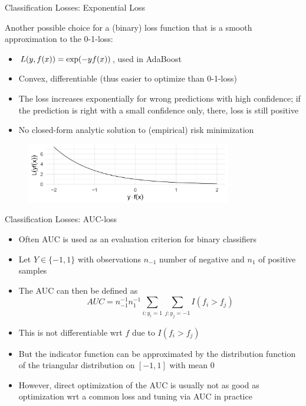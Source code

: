 \begin{vbframe}{Classification Losses: Exponential Loss}

Another possible choice for a (binary) loss function that is a smooth approximation to the 0-1-loss:
\begin{itemize}
\item $L(y, f(x)) = \exp(-yf(x))$, used in AdaBoost
\item Convex, differentiable (thus easier to optimize than 0-1-loss)
\item The loss increases exponentially for wrong predictions with high confidence; if the prediction is right with a small confidence only, there, loss is still positive
\item No closed-form analytic solution to (empirical) risk minimization
\end{itemize}


\begin{figure}
\includegraphics[width = 0.8\textwidth]{figure_man/exponential-loss.png}
\end{figure}

\end{vbframe}

\begin{vbframe}{Classification Losses: AUC-loss}

\begin{itemize}
\item Often AUC is used as an evaluation criterion for binary classifiers
\item Let $Y \in \{-1, 1\}$ with observations $n_{-1}$ number of negative and $n_{1}$ of positive samples %
\item The AUC can then be defined as
$$AUC = n_{-1}^{-1} n_1^{-1} \sum_{i: y_i = 1} \sum_{j: y_j = -1} I(f_i > f_j)$$
\item This is not differentiable wrt $f$ due to $I(f_i > f_j)$
\item But the indicator function can be approximated by the distribution function of the triangular distribution on $[-1, 1]$ with mean $0$
\item However, direct optimization of the AUC is usually not as good as optimization wrt a common loss and tuning via AUC in practice 

\end{itemize}
\end{vbframe}





\endlecture

